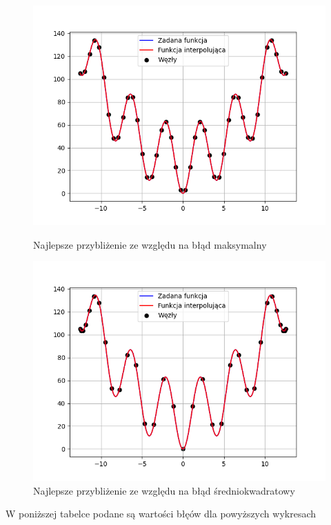 \documentclass{article}
\begin{document}
\begin{figure}[H]
  \begin{minipage}[b]{0.49\textwidth}
    \includegraphics[width=\textwidth]{img11.png}
    \caption{Najlepsze przybliżenie ze względu na błąd maksymalny}
  \end{minipage}
  \hfill
  \begin{minipage}[b]{0.49\textwidth}
    \includegraphics[width=\textwidth]{img12.png}
    \caption{Najlepsze przybliżenie ze względu na błąd średniokwadratowy}
  \end{minipage}
\end{figure}

\noindent
W poniższej tabelce podane są wartości błęów dla powyższych wykresach
\end{document}
